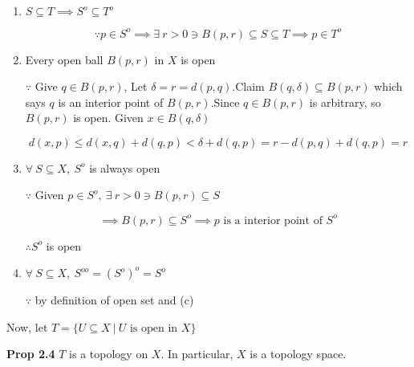 \begin{enumerate}[wide,label=\textbf{(\alph*)}] 
	\item $S \subseteq T \implies S^o \subseteq T^o$ 
	
	$$\because p \in S^o \implies \exists~r>0 \ni B(p,r) \subseteq S \subseteq T \implies p \in T^o$$
	\item Every open ball $B(p,r)$ in $X$ is open
	
	$\because$ Give $q \in B(p,r)$, Let $\delta = r = d(p,q)$.Claim $B(q,\delta) \subseteq B(p,r)$ which says $q$ is an interior point of $B(p,r)$.Since $q \in B(p,r)$ is arbitrary, so $B(p,r)$ is open. Given $x \in B(q,\delta)$
	
	$$d(x,p) \leq d(x,q) + d(q,p) < \delta + d(q,p) = r - d(p,q)+d(q,p)=r$$
	\item $\forall~S \subseteq X,~S^o$ is always open
	
	$\because$ Given $p \in S^o,~\exists~r>0 \ni B(p,r) \subseteq S$
	
	$$\implies B(p,r) \subseteq S^o \implies p \text{ is a interior point of }S^o$$
	
	$\therefore S^o$ is open
	
	\item $\forall~ S \subseteq X,~ S^{oo} = (S^o)^o = S^o$
	 
	$\because$ by definition of open set and (c)\\
\end{enumerate}


Now, let $T = \{U \subseteq X ~|~ U \text{ is open in }X\}$

\textbf{Prop 2.4} $T$ is a topology on $X$. In particular, $X$ is a topology space.



